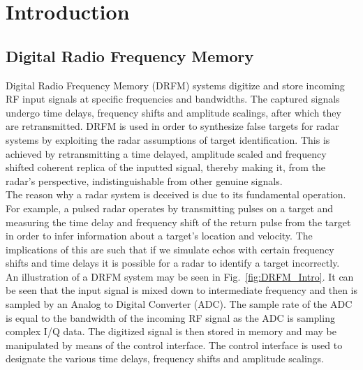 \section{Introduction}
	\subsection{Digital Radio Frequency Memory}
	\noindent Digital Radio Frequency Memory (DRFM) systems digitize and store incoming RF input signals at specific frequencies and bandwidths. The captured signals undergo time delays, frequency shifts and amplitude scalings, after which they are retransmitted. DRFM is used in order to synthesize false targets for radar systems by exploiting the radar assumptions of target identification. This is achieved by retransmitting a time delayed, amplitude scaled and frequency shifted coherent replica of the inputted signal, thereby making it, from the radar's perspective, indistinguishable from other genuine signals\cite{SJROOME}.\\ \newline The reason why a radar system is deceived is due to its fundamental operation. For example, a pulsed radar operates by transmitting pulses on a target and measuring the time delay and frequency shift of the return pulse from the target in order to infer information about a target's location and velocity. The implications of this are such that if we simulate echos with certain frequency shifts and time delays it is possible for a radar to identify a target incorrectly.\\ \newline An illustration of a DRFM system may be seen in Fig.~\ref{fig:DRFM_Intro}. It can be seen that the input signal is mixed down to intermediate frequency and then is sampled by an Analog to Digital Converter (ADC). The sample rate of the ADC is equal to the bandwidth of the incoming RF signal as the ADC is sampling complex I/Q data. The digitized signal is then stored in memory and may be manipulated by means of the control interface. The control interface is used to designate the various time delays, frequency shifts and amplitude scalings. 
